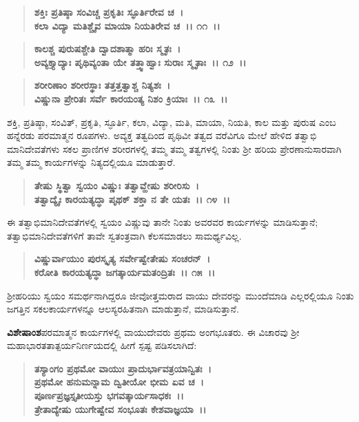 \begin{verse}
\textbf{ಶಕ್ತಿಃ ಪ್ರತಿಷ್ಠಾ ಸಂವಿಚ್ಚ ಪ್ರಕೃತಿಃ ಸ್ಫೂರ್ತಿರೇವ ಚ~।}\\\textbf{ಕಲಾ ವಿದ್ಯಾ ಮತಿಶ್ಚೈವ ಮಾಯಾ ನಿಯತಿರೇವ ಚ~।। ೧೧~।। }
\end{verse}

\begin{verse}
\textbf{ಕಾಲಶ್ಚ ಪುರುಷಶ್ಚೇತಿ ದ್ವಾದಶಾತ್ಮಾ ಹರಿಃ ಸ್ಮೃತಃ~।}\\\textbf{ಅವ್ಯಕ್ತ್ಯಾದ್ಯಾಃ ಪೃಥಿವ್ಯಂತಾ ಯೇ ತತ್ತ್ವಾಹ್ವಾಃ ಸುರಾಃ ಸ್ಮೃತಾಃ~।। ೧೨~।।}
\end{verse}

\begin{verse}
\textbf{ಶರೀರಿಣಾಂ ಶರೀರಸ್ಥಾಃ ತತ್ತತ್ತತ್ವಾಶ್ಚ ನಿತ್ಯಶಃ~।}\\\textbf{ವಿಷ್ಣುನಾ ಪ್ರೇರಿತಃ ಸರ್ವೆ ಕಾರಯಂತ್ಯ ನಿಶಂ ಕ್ರಿಯಾಃ~।। ೧೩~।।}
\end{verse}

ಶಕ್ತಿ, ಪ್ರತಿಷ್ಠಾ, ಸಂವಿತ್, ಪ್ರಕೃತಿ, ಸ್ಫೂರ್ತಿ, ಕಲಾ, ವಿದ್ಯಾ, ಮತಿ, ಮಾಯಾ, ನಿಯತಿ, ಕಾಲ ಮತ್ತು ಪುರುಷ ಎಂಬ ಹನ್ನೆರಡು ಪರಮಾತ್ಮನ ರೂಪಗಳು. ಅವ್ಯಕ್ತ ತತ್ವದಿಂದ ಪೃಥಿವೀ ತತ್ವದ ವರೆವಿಗೂ ಮೇಲೆ ಹೇಳಿದ ತತ್ವಾಭಿ ಮಾನಿದೇವತೆಗಳು ಸಕಲ ಪ್ರಾಣಿಗಳ ಶರೀರಗಳಲ್ಲಿ ತಮ್ಮ ತಮ್ಮ ತತ್ವಗಳಲ್ಲಿ ನಿಂತು ಶ‍್ರೀ ಹರಿಯ ಪ್ರೇರಣಾನುಸಾರವಾಗಿ ತಮ್ಮ ತಮ್ಮ ಕಾರ್ಯಗಳನ್ನು ನಿತ್ಯದಲ್ಲಿಯೂ ಮಾಡುತ್ತಾರೆ.

\begin{verse}
\textbf{ತೇಷು ಸ್ಥಿತ್ವಾ ಸ್ವಯಂ ವಿಷ್ಣುಃ ತತ್ವಾವ್ಹೇಷು ಶರೀರಿಸು~।}\\\textbf{ತತ್ವಾದ್ಯೈಃ ಕಾರಯತ್ಯದ್ಧಾ ಪೃಥಕ್ ಶಕ್ತಾ ನ ತೇ ಯತಃ~।। ೧೪~।।}
\end{verse}

ಈ ತತ್ವಾಭಿಮಾನಿದೇವತೆಗಳಲ್ಲಿ ಸ್ವಯಂ ವಿಷ್ಣುವು ತಾನೇ ನಿಂತು ಅವರವರ ಕಾರ್ಯಗಳನ್ನು ಮಾಡಿಸುತ್ತಾನೆ; ತತ್ವಾಭಿಮಾನಿದೇವತೆಗಳಿಗೆ ತಾವೇ ಸ್ವತಂತ್ರವಾಗಿ ಕೆಲಸಮಾಡಲು ಸಾಮರ್ಥ್ಯವಿಲ್ಲ.

\begin{verse}
\textbf{ವಿಷ್ಣುರ್ವಾಯುಂ ಪುರಸ್ಕೃತ್ಯ ಸರ್ವೇಷ್ವೇತೇಷು ಸಂಚರನ್~।}\\\textbf{ಕರೋತಿ ಕಾರಯತ್ಯದ್ಧಾ ಜಗತ್ಕಾರ್ಯಮತಂದ್ರಿತಃ~।। ೧೫~।।}
\end{verse}

ಶ‍್ರೀಹರಿಯು ಸ್ವಯಂ ಸಮರ್ಥನಾಗಿದ್ದರೂ ಜೀವೋತ್ತಮರಾದ ವಾಯು ದೇವರನ್ನು ಮುಂದೆಮಾಡಿ ಎಲ್ಲರಲ್ಲಿಯೂ ನಿಂತು ಜಗತ್ತಿನ ಸಕಲಕಾರ್ಯಗಳನ್ನೂ ಆಲಸ್ಯರಹಿತನಾಗಿ ಮಾಡುತ್ತಾನೆ, ಮಾಡಿಸುತ್ತಾನೆ.

\textbf{ವಿಶೇಷಾಂಶ\enginline{-}}ಪರಮಾತ್ಮನ ಕಾರ್ಯಗಳಲ್ಲಿ ವಾಯುದೇವರು ಪ್ರಥಮ ಅಂಗಭೂತರು. ಈ ವಿಚಾರವು ಶ‍್ರೀ ಮಹಾಭಾರತತಾತ್ಪರ್ಯನಿರ್ಣಯದಲ್ಲಿ ಹೀಗೆ ಸ್ಪಷ್ಟ ಪಡಿಸಲಾಗಿದೆ:

\begin{verse}
\textbf{ತಸ್ಯಾಂಗಂ ಪ್ರಥಮೋ ವಾಯುಃ ಪ್ರಾದುರ್ಭಾವತ್ರಯಾನ್ವಿತಃ~।}\\\textbf{ಪ್ರಥಮೋ ಹನುಮನ್ನಾಮ ದ್ವಿತೀಯೋ ಭೀಮ ಏವ ಚ~। }\\\textbf{ಪೂರ್ಣಪ್ರಜ್ಞಸ್ತೃತೀಯಸ್ತು ಭಗವತ್ಕಾರ್ಯಸಾಧಕಃ~।।} \\\textbf{ತ್ರೇತಾದ್ಯೇಷು ಯುಗೇಷ್ವೇವ ಸಂಭೂತಃ ಕೇಶವಾಜ್ಞಯಾ~।।}
\end{verse}


